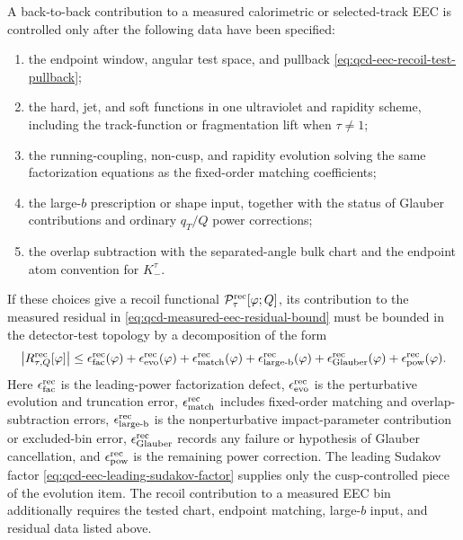 \begin{controlledapproximation}
\label{ca:qcd-eec-tested-back-to-back-recoil}
A back-to-back contribution to a measured calorimetric or selected-track EEC
is controlled only after the following data have been specified:
\begin{enumerate}
  \item the endpoint window, angular test space, and pullback
  \eqref{eq:qcd-eec-recoil-test-pullback};
  \item the hard, jet, and soft functions in one ultraviolet and rapidity
  scheme, including the track-function or fragmentation lift when
  \(\tau\ne1\);
  \item the running-coupling, non-cusp, and rapidity evolution solving the
  same factorization equations as the fixed-order matching coefficients;
  \item the large-\(b\) prescription or shape input, together with the status
  of Glauber contributions and ordinary \(q_T/Q\) power corrections;
  \item the overlap subtraction with the separated-angle bulk chart and the
  endpoint atom convention for \(K_-^\tau\).
\end{enumerate}
If these choices give a recoil functional
\(\mathcal P_{\tau}^{\rm rec}[\varphi;Q]\), its contribution to the measured
residual in \eqref{eq:qcd-measured-eec-residual-bound} must be bounded in the
detector-test topology by a decomposition of the form
\begin{equation}
  \bigl|R_{\tau,Q}^{\rm rec}[\varphi]\bigr|
  \leq
  \epsilon_{\rm fac}^{\rm rec}(\varphi)
  +
  \epsilon_{\rm evo}^{\rm rec}(\varphi)
  +
  \epsilon_{\rm match}^{\rm rec}(\varphi)
  +
  \epsilon_{\rm large\text{-}b}^{\rm rec}(\varphi)
  +
  \epsilon_{\rm Glauber}^{\rm rec}(\varphi)
  +
  \epsilon_{\rm pow}^{\rm rec}(\varphi).
  \label{eq:qcd-eec-tested-recoil-residual-bound}
\end{equation}
Here \(\epsilon_{\rm fac}^{\rm rec}\) is the leading-power factorization
defect, \(\epsilon_{\rm evo}^{\rm rec}\) is the perturbative evolution and
truncation error, \(\epsilon_{\rm match}^{\rm rec}\) includes fixed-order
matching and overlap-subtraction errors, \(\epsilon_{\rm large\text{-}b}^{\rm rec}\)
is the nonperturbative impact-parameter contribution or excluded-bin error,
\(\epsilon_{\rm Glauber}^{\rm rec}\) records any failure or hypothesis of
Glauber cancellation, and \(\epsilon_{\rm pow}^{\rm rec}\) is the remaining
power correction.  The leading Sudakov factor
\eqref{eq:qcd-eec-leading-sudakov-factor} supplies only the cusp-controlled
piece of the evolution item.  The recoil contribution to a measured EEC bin
additionally requires the tested chart, endpoint matching, large-\(b\)
input, and residual data listed above.
\end{controlledapproximation}

